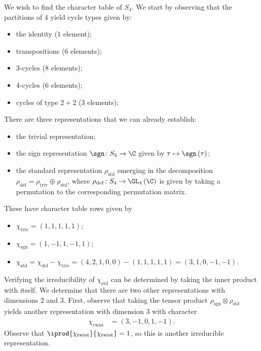 \documentclass[10pt]{mypackage}
\begin{document}
\begin{example}
  We wish to find the character table of $S_4$. We start by observing that the partitions of $4$ yield cycle types given by:
  \begin{itemize}
    \item the identity ($1$ element);
    \item transpositions ($6$ elements);
    \item $3$-cycles ($8$ elements);
    \item $4$-cycles ($6$ elements);
    \item cycles of type $2 + 2$ ($3$ elements);
  \end{itemize}
  There are three representations that we can already establish:
  \begin{itemize}
    \item the trivial representation;
    \item the sign representation $\sgn\colon S_4\rightarrow \C$ given by $\tau\mapsto \sgn\left( \tau \right)$;
    \item the standard representation $\rho_{\operatorname{std}}$ emerging in the decomposition $\rho_{\operatorname{def}} = \rho_{\operatorname{triv}}\oplus \rho_{\operatorname{std}}$, where $\rho_{\operatorname{def}}\colon S_4\rightarrow \GL_4\left( \C \right)$ is given by taking a permutation to the corresponding permutation matrix.
  \end{itemize}
  These have character table rows given by
  \begin{itemize}
    \item $\chi_{\operatorname{triv}} = \left( 1,1,1,1,1 \right)$;
    \item $\chi_{\operatorname{sgn}} = \left( 1,-1,1,-1,1 \right)$;
    \item $\chi_{\operatorname{std}} = \chi_{\operatorname{def}} - \chi_{\operatorname{triv}} = \left( 4,2,1,0,0 \right)-\left( 1,1,1,1,1 \right) = \left( 3,1,0,-1,-1 \right)$.
  \end{itemize}
  Verifying the irreducibility of $\chi_{\operatorname{std}}$ can be determined by taking the inner product with itself. We determine that there are two other representations with dimensions $2$ and $3$. First, observe that taking the tensor product $\rho_{\operatorname{sgn}}\otimes \rho_{\operatorname{std}}$ yields another representation with dimension $3$ with character
  \begin{align*}
    \chi_{\operatorname{twist}} &= \left( 3,-1,0,1,-1 \right).
  \end{align*}
  Observe that $ \iprod{\chi_{\operatorname{twist}}}{\chi_{\operatorname{twist}}} = 1 $, so this is another irreducible representation.


\end{example}
\end{document}
